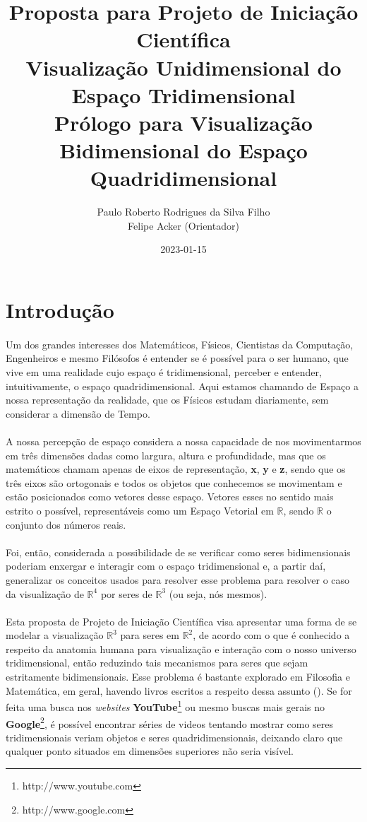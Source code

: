 \documentclass{article}
\title{
	Proposta para Projeto de Iniciação Científica \\
	Visualização Unidimensional do Espaço Tridimensional \\
	\large Prólogo para Visualização Bidimensional do Espaço Quadridimensional
}
\date{2023-01-15}
\author{Paulo Roberto Rodrigues da Silva Filho\\ \small Felipe Acker (Orientador)}
\newcommand\R{\mathbb{R}}
\begin{document}
	\maketitle
	\tableofcontents
	\section{Introdução}
	\paragraph{} Um dos grandes interesses dos Matemáticos, Físicos, Cientistas da Computação, Engenheiros e mesmo Filósofos é entender se é possível para o ser humano, que vive em uma realidade cujo espaço é tridimensional, perceber e entender, intuitivamente, o espaço quadridimensional. Aqui estamos chamando de Espaço a nossa representação da realidade, que os Físicos estudam diariamente, sem considerar a dimensão de Tempo. 
	
	\paragraph{}
	A nossa percepção de espaço considera a nossa capacidade de nos movimentarmos em três dimensões dadas como largura, altura e profundidade, mas que os matemáticos chamam apenas de eixos de representação, \textbf{x}, \textbf{y} e \textbf{z}, sendo que os três eixos são ortogonais e todos os objetos que conhecemos se movimentam e estão posicionados como vetores desse espaço. Vetores esses no sentido mais estrito o possível, representáveis como um Espaço Vetorial em $\R$, sendo $\R$ o conjunto dos números reais.
	
	\paragraph{}
	Foi, então, considerada a possibilidade de se verificar como seres bidimensionais poderiam enxergar e interagir com o espaço tridimensional e, a partir daí, generalizar os conceitos usados para resolver esse problema para resolver o caso da visualização de $\R^4$ por seres de $\R^3$ (ou seja, nós mesmos).
	
	\paragraph{}
	Esta proposta de Projeto de Iniciação Científica visa apresentar uma forma de se modelar a visualização $\R^3$ para seres em $\R^2$, de acordo com o que é conhecido a respeito da anatomia humana para visualização e interação com o nosso universo tridimensional, então reduzindo tais mecanismos para seres que sejam estritamente bidimensionais. Esse problema é bastante explorado em Filosofia e Matemática, em geral, havendo livros escritos a respeito dessa assunto (\citep[p.~56]{1992Abbott}). Se for feita uma busca nos \textit{websites} \textbf{YouTube}\footnote{http://www.youtube.com} ou mesmo buscas mais gerais no \textbf{Google}\footnote{http://www.google.com}, é possível encontrar séries de videos tentando mostrar como seres tridimensionais veriam objetos e seres quadridimensionais, deixando claro que qualquer ponto situados em dimensões superiores não seria visível.
	
\end{document}

